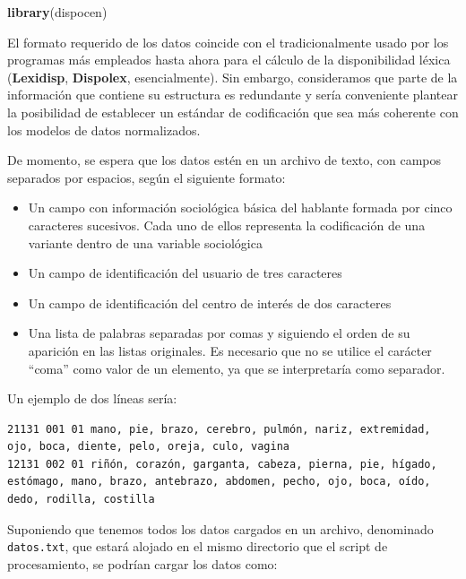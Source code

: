 \documentclass[
]{article}
\newenvironment{Shaded}{\begin{snugshade}}{\end{snugshade}}
\newcommand{\KeywordTok}[1]{\textcolor[rgb]{0.13,0.29,0.53}{\textbf{#1}}}
\newcommand{\NormalTok}[1]{#1}
\providecommand{\tightlist}{%
  \setlength{\itemsep}{0pt}\setlength{\parskip}{0pt}}
\begin{document}
\begin{Shaded}
\begin{Highlighting}[]
\KeywordTok{library}\NormalTok{(dispocen)}
\end{Highlighting}
\end{Shaded}

El formato requerido de los datos coincide con el tradicionalmente usado
por los programas más empleados hasta ahora para el cálculo de la
disponibilidad léxica (\textbf{Lexidisp}, \textbf{Dispolex},
esencialmente). Sin embargo, consideramos que parte de la información
que contiene su estructura es redundante y sería conveniente plantear la
posibilidad de establecer un estándar de codificación que sea más
coherente con los modelos de datos normalizados.

De momento, se espera que los datos estén en un archivo de texto, con
campos separados por espacios, según el siguiente formato:

\begin{itemize}
\tightlist
\item
  Un campo con información sociológica básica del hablante formada por
  cinco caracteres sucesivos. Cada uno de ellos representa la
  codificación de una variante dentro de una variable sociológica
\item
  Un campo de identificación del usuario de tres caracteres
\item
  Un campo de identificación del centro de interés de dos caracteres
\item
  Una lista de palabras separadas por comas y siguiendo el orden de su
  aparición en las listas originales. Es necesario que no se utilice el
  carácter ``coma'' como valor de un elemento, ya que se interpretaría
  como separador.
\end{itemize}

Un ejemplo de dos líneas sería:

\begin{verbatim}
21131 001 01 mano, pie, brazo, cerebro, pulmón, nariz, extremidad, ojo, boca, diente, pelo, oreja, culo, vagina 
12131 002 01 riñón, corazón, garganta, cabeza, pierna, pie, hígado, estómago, mano, brazo, antebrazo, abdomen, pecho, ojo, boca, oído, dedo, rodilla, costilla 
\end{verbatim}

Suponiendo que tenemos todos los datos cargados en un archivo,
denominado \texttt{datos.txt}, que estará alojado en el mismo directorio
que el script de procesamiento, se podrían cargar los datos como:
\end{document}
